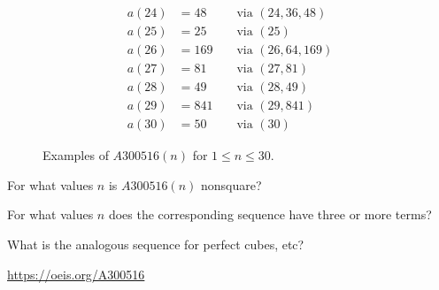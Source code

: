 \documentclass{article}
\begin{document}
\begin{figure}[h]
\begin{multicols}{3}
\begin{alignat*}{2}
      a(24) &= 48  &&\text{ via } (24, 36, 48)\\
      a(25) &= 25  &&\text{ via } (25)\\
      a(26) &= 169 &&\text{ via } (26, 64, 169)\\
      a(27) &= 81  &&\text{ via } (27, 81)\\
      a(28) &= 49  &&\text{ via } (28, 49)\\
      a(29) &= 841 &&\text{ via } (29, 841)\\
      a(30) &= 50  &&\text{ via } (30)
    \end{alignat*}
  \end{multicols}
  \caption{
    Examples of $A300516(n)$ for $1 \leq n \leq 30$.
  }
\end{figure}

\begin{related}
  \item For what values $n$ is $A300516(n)$ nonsquare?
  \item For what values $n$ does the corresponding sequence have three or more terms?
  \item What is the analogous sequence for perfect cubes, etc?
\end{related}

\begin{references}
  \item \url{https://oeis.org/A300516}
\end{references}
\end{document}
